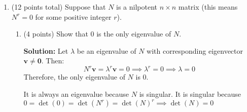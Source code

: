 \documentclass[12pt]{article}
\newcommand{\qspace}{\vspace{1em}} %
\newenvironment{solution}{\noindent\textbf{Solution:} }{\qspace}
\begin{document}
\begin{enumerate}
        \begin{solution}
        
        \textbf{Forward Direction (\( V \perp W \implies S \circ T = T \circ S \)):}

        If \( V \) and \( W \) are orthogonal, then projecting onto \( V \) after projecting onto \( W \) is the same as projecting onto \( W \) after projecting onto \( V \). Specifically, since \( V \perp W \), the projections do not interfere with each other:
        \[
        S(T(\mathbf{x})) = S(\text{proj}_W(\mathbf{x})) = \text{proj}_V(\text{proj}_W(\mathbf{x})) = 0
        \]
        Similarly,
        \[
        T(S(\mathbf{x})) = T(\text{proj}_V(\mathbf{x})) = \text{proj}_W(\text{proj}_V(\mathbf{x})) = 0
        \]
        Hence, \( S \circ T = T \circ S \).

        \textbf{Reverse Direction (\( S \circ T = T \circ S \implies V \perp W \)):}

        Assume \( S \circ T = T \circ S \). Consider any \( v \in V \) and \( w \in W \). Then:
        \[
        S(T(v + w)) = S(\text{proj}_W(v + w)) = S(w) = 0
        \]
        \[
        T(S(v + w)) = T(\text{proj}_V(v + w)) = T(v) = 0
        \]
        Since \( S \circ T = T \circ S \), we have:
        \[
        S(T(v + w)) = T(S(v + w)) \implies 0 = 0
        \]
        To show orthogonality, take \( v \in V \) and \( w \in W \). Since \( V \cap W = \{0\} \), the only way the projections commute is if \( \langle v, w \rangle = 0 \). Therefore, \( V \) and \( W \) are orthogonal.
        \end{solution}
    
    \item (12 points total)
    Suppose that \( N \) is a nilpotent \( n \times n \) matrix (this means \( N^r = 0 \) for some positive integer \( r \)).
    \begin{enumerate}
        \item (4 points) Show that \( 0 \) is the only eigenvalue of \( N \).
        
        \begin{solution}
        Let \( \lambda \) be an eigenvalue of \( N \) with corresponding eigenvector \( \mathbf{v} \neq \mathbf{0} \). Then:
        \[
        N^r \mathbf{v} = \lambda^r \mathbf{v} = 0 \implies \lambda^r = 0 \implies \lambda = 0
        \]
        Therefore, the only eigenvalue of \( N \) is \( 0 \).

        It is always an eigenvalue because $N$ is singular. It is singular because $0 = \det(0) = \det(N^r) = \det(N)^r \implies \det(N) = 0$
        \end{solution}
        

\end{enumerate}
\end{enumerate}
\end{document}
